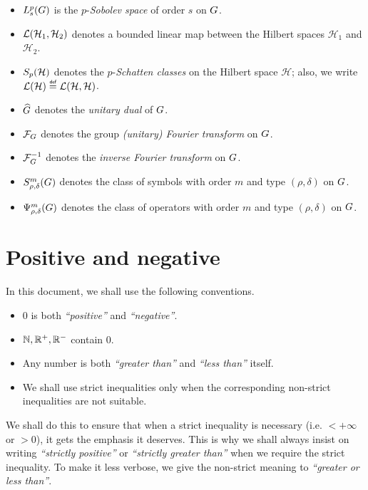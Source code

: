 \begin{itemize}
    \item $L^{p}_{s}(G)$ is the $p$-\emph{Sobolev space} of order $s$ on $G$.
    \item ${\mathcal{L} (\mathcal H_1, \mathcal H_2)}$ denotes a bounded linear map between the Hilbert spaces $\mathcal H_1$ and $\mathcal H_2$.
    \item $S_{p}(\mathcal H)$ denotes the $p$-\emph{Schatten classes} on the Hilbert space $\mathcal H$; also, we write $\Lin {\mathcal H} \defeq \Lin {\mathcal H, \mathcal H}$.
    \item ${\widehat{G}}$ denotes the \emph{unitary dual} of $G$.
    \item $\mathcal{F}_{G}$ denotes the group \emph{(unitary) Fourier transform} on $G$.
    \item $\mathcal{F}^{-1}_{G}$ denotes the \emph{inverse Fourier transform} on $G$.
    \item $S^{m}_{\rho, \delta}(G)$ denotes the class of symbols with order $m$ and type $(\rho, \delta)$ on $G$.
    \item $\Psi^{m}_{\rho, \delta}(G)$ denotes the class of operators with order $m$ and type $(\rho, \delta)$ on $G$.
\end{itemize}

\section*{Positive and negative}

In this document, we shall use the following conventions.

\begin{itemize}
    \item $0$ is both \emph{``positive''} and \emph{``negative''}.
    \item $\mathbb{N}, \mathbb{R}^+, \mathbb{R}^-$ contain $0$.
    \item Any number is both \emph{``greater than''} and \emph{``less than''} itself.
    \item We shall use strict inequalities only
        when the corresponding non-strict inequalities are not suitable.
\end{itemize}

We shall do this to ensure that
when a strict inequality is necessary (i.e. $< +\infty$ or $> 0$),
it gets the emphasis it deserves.
This is why we shall always insist on writing \emph{``strictly positive''} or \emph{``strictly greater than''} when we require the strict inequality.
To make it less verbose,
we give the non-strict meaning to \emph{``greater or less than''}.

